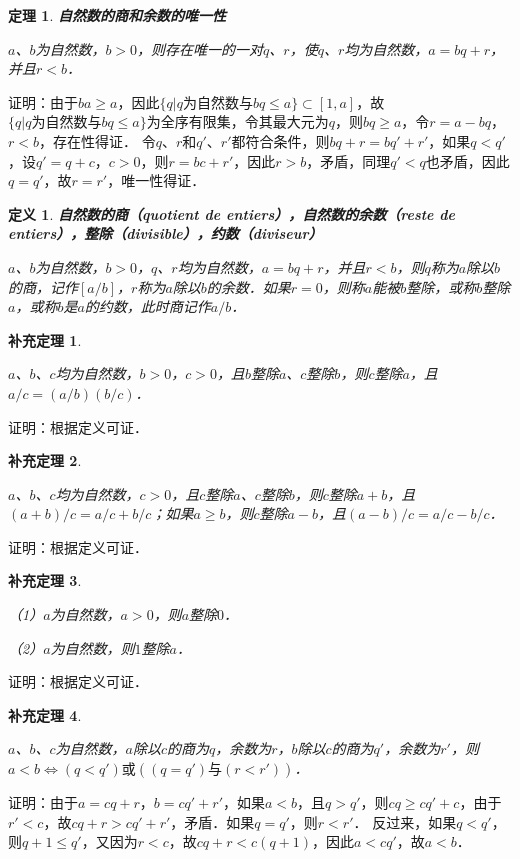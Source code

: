 \documentclass[12pt, a4paper, oneside]{book}
\newtheorem{theo}{定理}
\newtheorem{cor}{补充定理}
\newtheorem{de}{定义}
\begin{document}
			\begin{theo}\label{theo140}
				\textbf{自然数的商和余数的唯一性}\par
				$a$、$b$为自然数，$b>0$，则存在唯一的一对$q$、$r$，使$q$、$r$均为自然数，$a=bq+r$，并且$r<b$．
			\end{theo}
			证明：由于$ba\geq a$，因此$\{q|q为自然数\text{与}bq\leq a\}\subset [1, a]$，故$\{q|q为自然数\text{与}bq\leq a\}$为全序有限集，令其最大元为$q$，则$bq\geq a$，令$r=a-bq$，$r<b$，存在性得证．
			令$q$、$r$和$q'$、$r'$都符合条件，则$bq+r=bq'+r'$，如果$q<q'$，设$q'=q+c$，$c>0$，则$r=bc+r'$，因此$r>b$，矛盾，同理$q'<q$也矛盾，因此$q=q'$，故$r=r'$，唯一性得证．
			
			\begin{de}
				\textbf{自然数的商（quotient de entiers），自然数的余数（reste de entiers），整除（divisible），约数（diviseur）}
				\par
				$a$、$b$为自然数，$b>0$，$q$、$r$均为自然数，$a=bq+r$，并且$r<b$，则$q$称为$a$除以$b$的商，记作$[a/b]$，$r$称为$a$除以$b$的余数．如果$r=0$，则称$a$能被$b$整除，或称$b$整除$a$，或称$b$是$a$的约数，此时商记作$a/b$．
			\end{de}
			
			\begin{cor}\label{cor315}
				\hfill\par
				$a$、$b$、$c$均为自然数，$b>0$，$c>0$，且$b$整除$a$、$c$整除$b$，则$c$整除$a$，且$a/c=(a/b)(b/c)$．
			\end{cor}
			证明：根据定义可证．
			
			\begin{cor}\label{cor316}
				\hfill\par
				$a$、$b$、$c$均为自然数，$c>0$，且$c$整除$a$、$c$整除$b$，则$c$整除$a+b$，且$(a+b)/c=a/c+b/c$；如果$a\geq b$，则$c$整除$a-b$，且$(a-b)/c=a/c-b/c$．
			\end{cor}
			证明：根据定义可证．
			
			\begin{cor}\label{cor317}
				\hfill\par
				（1）$a$为自然数，$a>0$，则$a$整除$0$．
				\par
				（2）$a$为自然数，则$1$整除$a$．
			\end{cor}
			证明：根据定义可证．
			
			\begin{cor}\label{cor318}
				\hfill\par
				$a$、$b$、$c$为自然数，$a$除以$c$的商为$q$，余数为$r$，$b$除以$c$的商为$q'$，余数为$r'$，则$a<b\Leftrightarrow(q<q')\text{或}((q=q')\text{与}(r<r'))$．
			\end{cor}
			证明：由于$a=cq+r$，$b=cq'+r'$，如果$a<b$，且$q>q'$，则$cq\geq cq'+c$，由于$r '<c$，故$cq+r>cq'+r'$，矛盾．如果$q=q'$，则$r<r'$．
			反过来，如果$q<q'$，则$q+1\leq q'$，又因为$r<c$，故$cq+r<c(q+1)$，因此$a<cq'$，故$a<b$．
			
\end{document}
